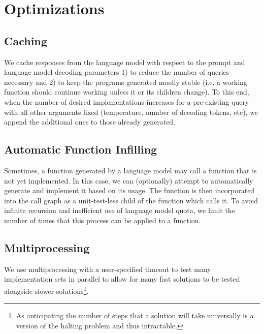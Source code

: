 \section{Optimizations}
\label{optimizations}
\vspace{-3px}
\subsection{Caching}
\vspace{-3px}
We cache responses from the language model with respect to the prompt and language model decoding parameters 1) to reduce the number of queries necessary and 2) to keep the programs generated mostly stable (i.e. a working function should continue working unless it or its children change). To this end, when the number of desired implementations increases for a pre-existing query with all other arguments fixed (temperature, number of decoding tokens, etc), we append the additional ones to those already generated.

\vspace{-3px}
\subsection{Automatic Function Infilling}
\vspace{-3px}
Sometimes, a function generated by a language model may call a function that is not yet implemented. In this case, we can (optionally) attempt to automatically generate and implement it based on its usage. The function is then incorporated into the call graph as a unit-test-less child of the function which calls it. To avoid infinite recursion and inefficient use of language model quota, we limit the number of times that this process can be applied to a function.

\subsection{Multiprocessing}
We use multiprocessing with a user-specified timeout to test many implementation sets in parallel to allow for many fast solutions to be tested alongside slower solutions\footnote{As anticipating the number of steps that a solution will take universally is a version of the halting problem and thus intractable.}.


